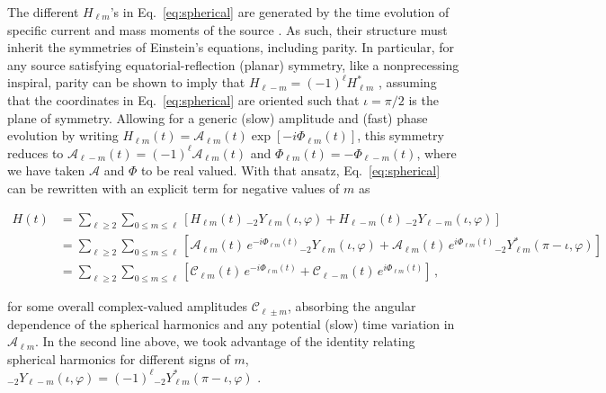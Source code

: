 \documentclass[aps,prd,twocolumn,superscriptaddress,preprintnumbers,floatfix,nofootinbib]{revtex4-2}
\newcommand*{\eq}[1]{Eq.~\eqref{eq:#1}}
\begin{document}
The different $H_{\ell m}$'s in \eq{spherical} are generated by the time evolution of specific current and mass moments of the source \cite{Thorne:1980ru}.
As such, their structure must inherit the symmetries of Einstein's equations, including parity.
In particular, for any source satisfying equatorial-reflection (planar) symmetry, like a nonprecessing inspiral, parity can be shown to imply that $H_{\ell -m} = (-1)^\ell H_{\ell m}^*$ \cite{Faye:2012we}, assuming that the coordinates in \eq{spherical} are oriented such that $\iota=\pi/2$ is the plane of symmetry.
Allowing for a generic (slow) amplitude and (fast) phase evolution by writing $H_{\ell m}(t) = \mathcal{A}_{\ell m}(t) \exp[-i \Phi_{\ell m}(t)]$, this symmetry reduces to $\mathcal{A}_{\ell -m}(t) = (-1)^\ell \mathcal{A}_{\ell m}(t)$ and $\Phi_{\ell m}(t) = - \Phi_{\ell -m}(t)$, where we have taken $\mathcal{A}$ and $\Phi$ to be real valued.
With that ansatz, \eq{spherical} can be rewritten with an explicit term for negative values of $m$ as
\begin{widetext}
\begin{subequations} \label{eq:spherical_modes}
\begin{align}
H(t) &= \sum_{\ell \geq 2} \sum_{0\leq m \leq \ell} \left[H_{\ell m}(t)\, {}_{-2}Y_{\ell m} (\iota, \varphi) + H_{\ell -m}(t)\, {}_{-2}Y_{\ell -m} (\iota, \varphi) \right] \\
&= \sum_{\ell \geq 2} \sum_{0\leq m \leq \ell} \left[\mathcal{A}_{\ell m}(t)\, e^{-i\Phi_{\ell m} (t)} {}_{-2}Y_{\ell m}(\iota, \varphi) +  \mathcal{A}_{\ell m}(t)\, e^{i\Phi_{\ell m} (t)} {}_{-2}Y_{\ell m}^*(\pi-\iota, \varphi) \right] \\
&= \sum_{\ell \geq 2} \sum_{0\leq m \leq \ell} \left[\mathcal{C}_{\ell m}(t)\, e^{-i\Phi_{\ell m} (t)}  +  \mathcal{C}_{\ell -m}(t)\, e^{i\Phi_{\ell m} (t)} \right]\, ,
\end{align}
\end{subequations}
\end{widetext}
for some overall complex-valued amplitudes $\mathcal{C}_{\ell \pm m}$, absorbing the angular dependence of the spherical harmonics and any potential (slow) time variation in $\mathcal{A}_{\ell m}$.
In the second line above, we took advantage of the identity relating spherical harmonics for different signs of $m$, ${}_{-2} Y_{\ell -m}(\iota,\varphi) = (-1)^{\ell} {}_{-2} Y_{\ell m}^*(\pi-\iota,\varphi)$ \cite{goldberg:1967}.
\end{document}
